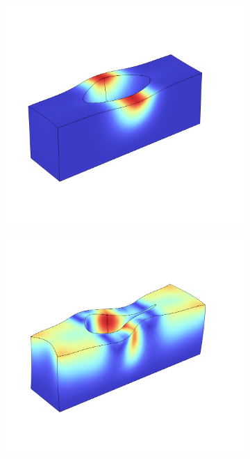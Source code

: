 \begin{figure}[htpb]
	\centering
	\begin{subfigure}[]{0.24\textwidth}
		\begin{center}
			\includegraphics[width=\textwidth]{chapters/theory/modeshape_1.png}
		\end{center}
		\subcaption{}%
		\label{fig:ms1}
	\end{subfigure}
	\begin{subfigure}[]{0.24\textwidth}
		\begin{center}
			\includegraphics[width=\textwidth]{chapters/theory/modeshape_2.png}

\end{center}
\end{subfigure}
\end{figure}
